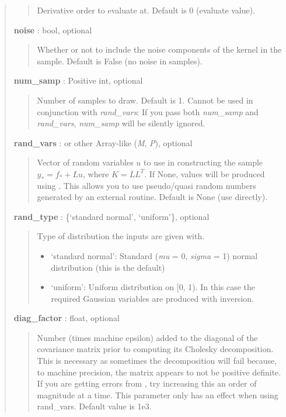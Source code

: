 \documentclass[letterpaper,10pt,english]{sphinxmanual}
\begin{document}
\begin{fulllineitems}
\begin{fulllineitems}
\begin{quote}
\begin{description}
\begin{quote}
Derivative order to evaluate at. Default is 0 (evaluate value).
\end{quote}

\textbf{noise} : bool, optional
\begin{quote}

Whether or not to include the noise components of the kernel in the
sample. Default is False (no noise in samples).
\end{quote}

\textbf{num\_samp} : Positive int, optional
\begin{quote}

Number of samples to draw. Default is 1. Cannot be used in
conjunction with \emph{rand\_vars}: If you pass both \emph{num\_samp} and
\emph{rand\_vars}, \emph{num\_samp} will be silently ignored.
\end{quote}

\textbf{rand\_vars} :  or other Array-like (\emph{M}, \emph{P}), optional
\begin{quote}

Vector of random variables $u$ to use in constructing the
sample $y_* = f_* + Lu$, where $K=LL^T$. If None,
values will be produced using .
This allows you to use pseudo/quasi random numbers generated by
an external routine. Default is None (use 
directly).
\end{quote}

\textbf{rand\_type} : \{`standard normal', `uniform'\}, optional
\begin{quote}

Type of distribution the inputs are given with.
\begin{itemize}
\item {} 
`standard normal': Standard (\emph{mu} = 0, \emph{sigma} = 1) normal
distribution (this is the default)

\item {} 
`uniform': Uniform distribution on {[}0, 1). In this case
the required Gaussian variables are produced with inversion.

\end{itemize}
\end{quote}

\textbf{diag\_factor} : float, optional
\begin{quote}

Number (times machine epsilon) added to the diagonal of the
covariance matrix prior to computing its Cholesky decomposition.
This is necessary as sometimes the decomposition will fail because,
to machine precision, the matrix appears to not be positive definite.
If you are getting errors from , try increasing
this an order of magnitude at a time. This parameter only has an
effect when using rand\_vars. Default value is 1e3.
\end{quote}


\end{description}
\end{quote}
\end{fulllineitems}
\end{fulllineitems}
\end{document}
